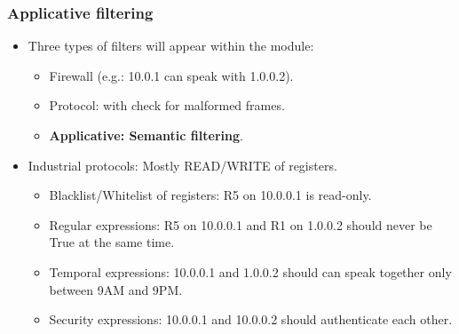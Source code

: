 \documentclass{beamer}
\begin{document}
\begin{frame}
    \frametitle{Applicative filtering}

    \begin{itemize}
        \item Three types of filters will appear within the module:
        \begin{itemize}
            \item Firewall (e.g.: 10.0.1 can speak with 1.0.0.2).
            \item Protocol: with check for malformed frames.
            \item {\bf Applicative: Semantic filtering}.
        \end{itemize}
    \end{itemize}
    \vfill
    \begin{itemize}
        \item Industrial protocols: Mostly READ/WRITE of registers.
        \begin{itemize}
            \item Blacklist/Whitelist of registers: R5 on 10.0.0.1 is read-only.
            \item Regular expressions: R5 on 10.0.0.1 and R1 on 1.0.0.2 should never be True at the same time.
            \item Temporal expressions: 10.0.0.1 and 1.0.0.2 should can speak together only between 9AM and 9PM.
            \item Security expressions: 10.0.0.1 and 10.0.0.2 should authenticate each other.
        \end{itemize}
    \end{itemize}
\end{frame}
\end{document}
